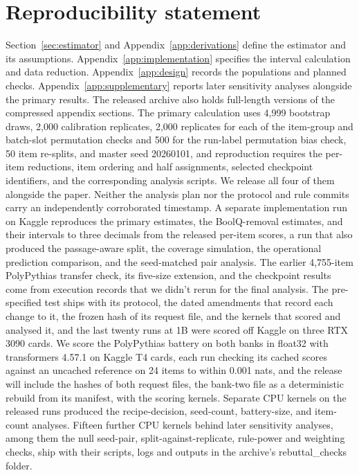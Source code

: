 \documentclass{article}
\begin{document}
\section*{Reproducibility statement}
Section~\ref{sec:estimator} and Appendix~\ref{app:derivations} define the estimator and its assumptions. Appendix~\ref{app:implementation} specifies the interval calculation and data reduction. Appendix~\ref{app:design} records the populations and planned checks. Appendix~\ref{app:supplementary} reports later sensitivity analyses alongside the primary results. The released archive also holds full-length versions of the compressed appendix sections. The primary calculation uses 4,999 bootstrap draws, 2,000 calibration replicates, 2,000 replicates for each of the item-group and batch-slot permutation checks and 500 for the run-label permutation bias check, 50 item re-splits, and master seed 20260101, and reproduction requires the per-item reductions, item ordering and half assignments, selected checkpoint identifiers, and the corresponding analysis scripts. We release all four of them alongside the paper. Neither the analysis plan nor the protocol and rule commits carry an independently corroborated timestamp. A separate implementation run on Kaggle reproduces the primary estimates, the BoolQ-removal estimates, and their intervals to three decimals from the released per-item scores, a run that also produced the passage-aware split, the coverage simulation, the operational prediction comparison, and the seed-matched pair analysis. The earlier 4,755-item PolyPythias transfer check, its five-size extension, and the checkpoint results come from execution records that we didn't rerun for the final analysis. The pre-specified test ships with its protocol, the dated amendments that record each change to it, the frozen hash of its request file, and the kernels that scored and analysed it, and the last twenty runs at 1B were scored off Kaggle on three RTX 3090 cards. We score the PolyPythias battery on both banks in float32 with transformers 4.57.1 on Kaggle T4 cards, each run checking its cached scores against an uncached reference on 24 items to within 0.001 nats, and the release will include the hashes of both request files, the bank-two file as a deterministic rebuild from its manifest, with the scoring kernels. Separate CPU kernels on the released runs produced the recipe-decision, seed-count, battery-size, and item-count analyses. Fifteen further CPU kernels behind later sensitivity analyses, among them the null seed-pair, split-against-replicate, rule-power and weighting checks, ship with their scripts, logs and outputs in the archive's rebuttal\_checks folder.


\clearpage
\appendix


\end{document}
